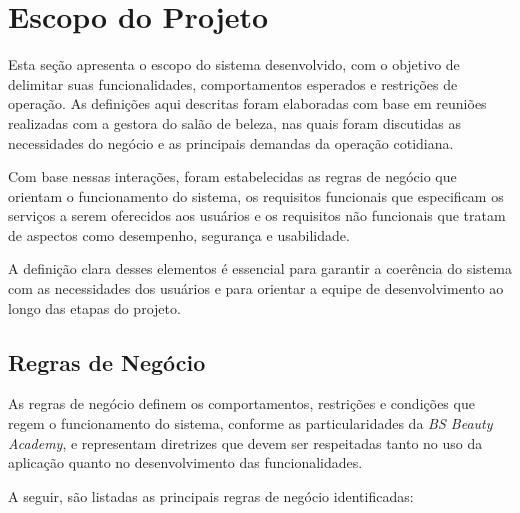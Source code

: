 \section{Escopo do Projeto}


Esta seção apresenta o escopo do sistema desenvolvido, com o objetivo de delimitar suas funcionalidades, comportamentos esperados e restrições de operação. As definições aqui descritas foram elaboradas com base em reuniões realizadas com a gestora do salão de beleza, nas quais foram discutidas as necessidades do negócio e as principais demandas da operação cotidiana.

Com base nessas interações, foram estabelecidas as regras de negócio que orientam o funcionamento do sistema, os requisitos funcionais que especificam os serviços a serem oferecidos aos usuários e os requisitos não funcionais que tratam de aspectos como desempenho, segurança e usabilidade.

A definição clara desses elementos é essencial para garantir a coerência do sistema com as necessidades dos usuários e para orientar a equipe de desenvolvimento ao longo das etapas do projeto.

\subsection{Regras de Negócio}

As regras de negócio definem os comportamentos, restrições e condições que regem o funcionamento do sistema, conforme as particularidades da \emph{BS Beauty Academy}, e representam diretrizes que devem ser respeitadas tanto no uso da aplicação quanto no desenvolvimento das funcionalidades.

A seguir, são listadas as principais regras de negócio identificadas:

